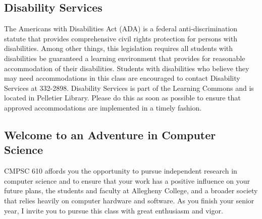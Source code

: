 

\vspace*{-.1in}
\subsection*{Disability Services}
\vspace*{-.05in}

The Americans with Disabilities Act (ADA) is a federal anti-discrimination statute that provides comprehensive civil
rights protection for persons with disabilities.  Among other things, this legislation requires all students with
disabilities be guaranteed a learning environment that provides for reasonable accommodation of their disabilities.
Students with disabilities who believe they may need accommodations in this class are encouraged to contact Disability
Services at 332-2898.  Disability Services is part of the Learning Commons and is located in Pelletier Library.
Please do this as soon as possible to ensure that approved accommodations are implemented in a timely fashion.

\vspace*{-.1in}
\subsection*{Welcome to an Adventure in Computer Science}
\vspace*{-.1in}


CMPSC 610 affords you the opportunity to pursue independent research in computer science and to ensure that your work
has a positive influence on your future plans, the students and faculty at Allegheny College, and a broader society that
relies heavily on computer hardware and software. As you finish your senior year, I invite you to pursue this class with
great enthusiasm and vigor.


